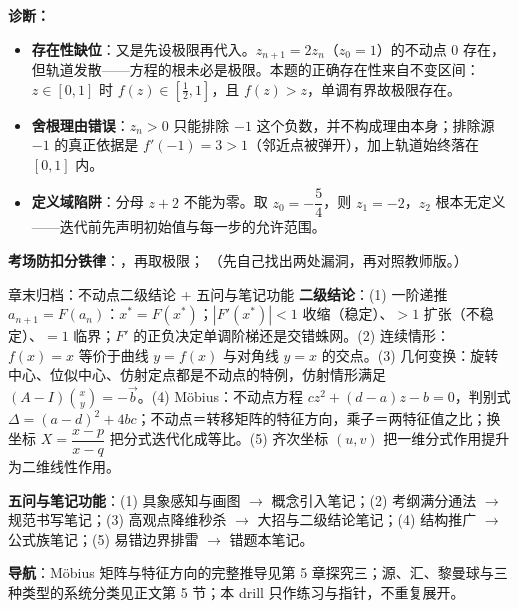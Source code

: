 \begin{tcolorbox}
\begin{enumerate}[label=(\arabic*), itemsep=4pt]
\ifteacher
{\bfseries\color{main}诊断：}
\begin{itemize}[itemsep=1pt]
\item \textbf{存在性缺位}：又是先设极限再代入。$z_{n+1}=2z_n$（$z_0=1$）的不动点 $0$ 存在，但轨道发散——方程的根未必是极限。本题的正确存在性来自不变区间：$z\in[0,1]$ 时 $f(z)\in[\tfrac12,1]$，且 $f(z)>z$，单调有界故极限存在。
\item \textbf{舍根理由错误}：$z_n>0$ 只能排除 $-1$ 这个负数，并不构成理由本身；排除源 $-1$ 的真正依据是 $f'(-1)=3>1$（邻近点被弹开），加上轨道始终落在 $[0,1]$ 内。
\item \textbf{定义域陷阱}：分母 $z+2$ 不能为零。取 $z_0=-\dfrac54$，则 $z_1=-2$，$z_2$ 根本无定义——迭代前先声明初始值与每一步的允许范围。
\end{itemize}

\textbf{考场防扣分铁律}：，再取极限；
\else
{\small（先自己找出两处漏洞，再对照教师版。）}
\fi
{}
\end{enumerate}
\end{tcolorbox}


\begin{notezone}{章末归档：不动点二级结论 + 五问与笔记功能}
\textbf{二级结论}：(1) 一阶递推 $a_{n+1}=F(a_n)$：$x^*=F(x^*)$；$|F'(x^*)|<1$ 收缩（稳定）、$>1$ 扩张（不稳定）、$=1$ 临界；$F'$ 的正负决定单调阶梯还是交错蛛网。(2) 连续情形：$f(x)=x$ 等价于曲线 $y=f(x)$ 与对角线 $y=x$ 的交点。(3) 几何变换：旋转中心、位似中心、仿射定点都是不动点的特例，仿射情形满足 $(A-I)\binom xy=-\vec b$。(4) Möbius：不动点方程 $cz^2+(d-a)z-b=0$，判别式 $\Delta=(a-d)^2+4bc$；不动点＝转移矩阵的特征方向，乘子＝两特征值之比；换坐标 $X=\dfrac{x-p}{x-q}$ 把分式迭代化成等比。(5) 齐次坐标 $(u,v)$ 把一维分式作用提升为二维线性作用。

\textbf{五问与笔记功能}：(1) 具象感知与画图 $\to$ 概念引入笔记；(2) 考纲满分通法 $\to$ 规范书写笔记；(3) 高观点降维秒杀 $\to$ 大招与二级结论笔记；(4) 结构推广 $\to$ 公式族笔记；(5) 易错边界排雷 $\to$ 错题本笔记。

\textbf{导航}：Möbius 矩阵与特征方向的完整推导见第 5 章探究三；源、汇、黎曼球与三种类型的系统分类见正文第 5 节；本 drill 只作练习与指针，不重复展开。
\end{notezone}
